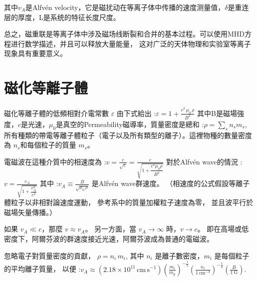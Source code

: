 \documentclass[12pt, a4paper, oneside]{article}
\begin{document}
\begin{spacing}{2.0}
其中$v_A$是Alfvén velocity，它是磁扰动在等离子体中传播的速度测量值，$\delta$是重连层的厚度，L是系统的特征长度尺度。

总之，磁重联是等离子体中涉及磁场线断裂和合并的基本过程。可以使用MHD方程进行数学描述，并且可以释放大量能量，
这对广泛的天体物理和实验室等离子现象具有重要意义。

\section{磁化等離子體}
磁化等離子體的低頻相對介電常數 $\varepsilon$ 由下式給出
:$ \varepsilon = 1 + \frac{c^2\,\mu_0\,\rho}{B^2}$
其中B是磁場強度，$c$是光速，$\mu_0$是真空的Permeability磁導率，質量密度是總和
:$ \rho = \sum_s n_s m_s ,$
所有種類的帶電等離子體粒子（電子以及所有類型的離子）。這裡物種的數量密度為 $n_s$和每個粒子的質量 $m_s$。

電磁波在這種介質中的相速度為
:$ v = \frac{c}{\sqrt{\varepsilon}} = \frac{c}{\sqrt{1 + \dfrac{c^2 \mu_0 \rho}{B^2}}}$
對於Alfvén wave的情況
:$ v = \frac{v_A}{\sqrt{1 + \dfrac{v_A^2}{c^2}}}$
其中
:$ v_A \equiv \frac{B}{\sqrt{\mu_0\,\rho}}$
是Alfvén wave群速度。
（相速度的公式假設等離子體粒子以非相對論速度運動，
參考系中的質量加權粒子速度為零，
並且波平行於磁場矢量傳播。）

如果 $v_A \ll c$，那麼 $v \approx v_A$。
另一方面，當 $v_A \to \infty$ 時，$v \to c$。 即在高場或低密度下，阿爾芬波的群速度接近光速，阿爾芬波成為普通的電磁波。

忽略電子對質量密度的貢獻，
$\rho = n_i\,m_i$,
其中 $n_i$ 是離子數密度，$m_i$ 是每個粒子的平均離子質量，
以便
:$v_A \approx \left(2.18 \times 10^{11}\,\text{cm}\,\text{s}^{-1}\right) \left(\frac{m_i}{m_p}\right)^{-\frac{1}{2}} \left(\frac{n_i}{1~\text{cm}^{-3}}\right)^{-\frac{1}{2} } \left(\frac{B}{1~\text{G}}\right).$









\end{spacing}{}


\end{document}
